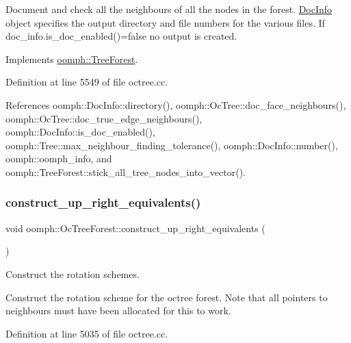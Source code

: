 Document and check all the neighbours of all the nodes in the forest. \hyperlink{classoomph_1_1DocInfo}{Doc\+Info} object specifies the output directory and file numbers for the various files. If {\ttfamily doc\+\_\+info.\+is\+\_\+doc\+\_\+enabled()=false} no output is created. 

Implements \hyperlink{classoomph_1_1TreeForest_a0e6a7f821d9f14374c6d23d8766c7679}{oomph\+::\+Tree\+Forest}.



Definition at line 5549 of file octree.\+cc.



References oomph\+::\+Doc\+Info\+::directory(), oomph\+::\+Oc\+Tree\+::doc\+\_\+face\+\_\+neighbours(), oomph\+::\+Oc\+Tree\+::doc\+\_\+true\+\_\+edge\+\_\+neighbours(), oomph\+::\+Doc\+Info\+::is\+\_\+doc\+\_\+enabled(), oomph\+::\+Tree\+::max\+\_\+neighbour\+\_\+finding\+\_\+tolerance(), oomph\+::\+Doc\+Info\+::number(), oomph\+::oomph\+\_\+info, and oomph\+::\+Tree\+Forest\+::stick\+\_\+all\+\_\+tree\+\_\+nodes\+\_\+into\+\_\+vector().

\mbox{\label{classoomph_1_1OcTreeForest_a56671092f989c606440f656d8910862b}} 
\subsubsection{\texorpdfstring{construct\+\_\+up\+\_\+right\+\_\+equivalents()}{construct\_up\_right\_equivalents()}}
{\footnotesize\ttfamily void oomph\+::\+Oc\+Tree\+Forest\+::construct\+\_\+up\+\_\+right\+\_\+equivalents (\begin{DoxyParamCaption}{ }\end{DoxyParamCaption})\hspace{0.3cm}{\ttfamily [private]}}



Construct the rotation schemes. 

Construct the rotation scheme for the octree forest. Note that all pointers to neighbours must have been allocated for this to work. 

Definition at line 5035 of file octree.\+cc.



